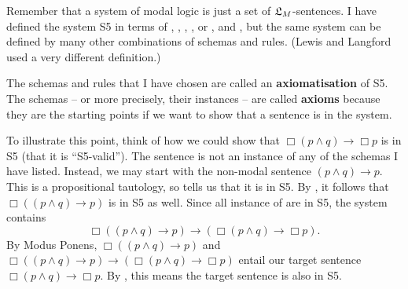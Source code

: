 \begin{solution}
\begin{sollist}

\end{sollist}
\end{solution}

Remember that a system of modal logic is just a set of $\mathfrak{L}_{M}$-sentences. I
have defined the system S5 in terms of , , , , or
,  and , but the same system can be defined by many
other combinations of schemas and rules. (Lewis and Langford used a very
different definition.)

The schemas and rules that I have chosen are called an \textbf{axiomatisation}
of S5. The schemas -- or more precisely, their instances -- are called
\textbf{axioms} because they are the starting points if we want to show that a
sentence is in the system.


To illustrate this point, think of how we could show that
$\Box(p \land q) \to \Box p$ is in S5 (that it is ``S5-valid''). The sentence is
not an instance of any of the schemas I have listed. Instead, we may start with
the non-modal sentence $(p \land q) \to p$. This is a propositional tautology,
so  tells us that it is in S5. By , it follows that
$\Box((p \land q) \to p)$ is in S5 as well. Since all instance of
 are in S5, the system contains
\[
  \Box((p \land q) \to p) \to (\Box(p \land q) \to \Box p).
\]
By Modus Ponens, $\Box((p \land q) \to p)$ and
$\Box((p \land q) \to p) \to (\Box(p \land q) \to \Box p)$ entail our target
sentence $\Box(p \land q) \to \Box p$. By , this means the target
sentence is also in S5.

